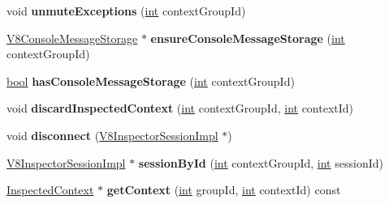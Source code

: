 \begin{DoxyCompactItemize}
\item 
\mbox{\label{classv8__inspector_1_1V8InspectorImpl_a67a4c428c016b8c0e1f12f0995b73c41}} 
void {\bfseries unmute\+Exceptions} (\mbox{\hyperlink{classint}{int}} context\+Group\+Id)
\item 
\mbox{\label{classv8__inspector_1_1V8InspectorImpl_a1b0265f528b7a1b22f27ba25a774eab1}} 
\mbox{\hyperlink{classv8__inspector_1_1V8ConsoleMessageStorage}{V8\+Console\+Message\+Storage}} $\ast$ {\bfseries ensure\+Console\+Message\+Storage} (\mbox{\hyperlink{classint}{int}} context\+Group\+Id)
\item 
\mbox{\label{classv8__inspector_1_1V8InspectorImpl_a69b0acac7d0fca5c63c465c1d9bcbe28}} 
\mbox{\hyperlink{classbool}{bool}} {\bfseries has\+Console\+Message\+Storage} (\mbox{\hyperlink{classint}{int}} context\+Group\+Id)
\item 
\mbox{\label{classv8__inspector_1_1V8InspectorImpl_a62bdf84ccc5bed9c78b8b067289b396f}} 
void {\bfseries discard\+Inspected\+Context} (\mbox{\hyperlink{classint}{int}} context\+Group\+Id, \mbox{\hyperlink{classint}{int}} context\+Id)
\item 
\mbox{\label{classv8__inspector_1_1V8InspectorImpl_a1d2273c5b099a5984082d4712fcd095f}} 
void {\bfseries disconnect} (\mbox{\hyperlink{classv8__inspector_1_1V8InspectorSessionImpl}{V8\+Inspector\+Session\+Impl}} $\ast$)
\item 
\mbox{\label{classv8__inspector_1_1V8InspectorImpl_ad3afc40c52bd16d5d29503d0a48b00c4}} 
\mbox{\hyperlink{classv8__inspector_1_1V8InspectorSessionImpl}{V8\+Inspector\+Session\+Impl}} $\ast$ {\bfseries session\+By\+Id} (\mbox{\hyperlink{classint}{int}} context\+Group\+Id, \mbox{\hyperlink{classint}{int}} session\+Id)
\item 
\mbox{\label{classv8__inspector_1_1V8InspectorImpl_a550d24d7ca6eb1ab57669eab2efe3df2}} 
\mbox{\hyperlink{classv8__inspector_1_1InspectedContext}{Inspected\+Context}} $\ast$ {\bfseries get\+Context} (\mbox{\hyperlink{classint}{int}} group\+Id, \mbox{\hyperlink{classint}{int}} context\+Id) const

\end{DoxyCompactItemize}
